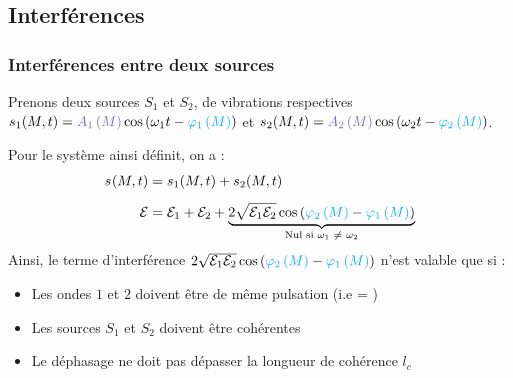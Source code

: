 \documentclass[11pt,a4paper,fleqn,pdftex]{report}
\begin{document}
\subsection{Interférences}
\subsubsection{Interférences entre deux sources}
Prenons deux sources $S_1$ et $S_2$, de vibrations respectives $\vibration[1] = \amplitude[1]{M}  \cos \left( \pulsation[1] t - \phase[1]{M} \right)$ et $\vibration[2] = \amplitude[2]{M}  \cos \left( \pulsation[2] t - \phase[2]{M} \right)$. \\
\begin{itheorem}
Pour le système ainsi définit, on a :
\begin{align}\label{interferences}
\vibration &= \vibration[1] + \vibration[2] \nonumber \\[5pt]
\Epsilon &= \Epsilon_1 + \Epsilon_2 + \underbrace{2 \sqrt{\Epsilon_1 \Epsilon_2}\cos \left( \phase[2]{M} - \phase[1]{M} \right)}_{\text{Nul si \pulsation[1] $\neq$ \pulsation[2]}}
\end{align}
%
Ainsi, le terme d'interférence $2 \sqrt{\Epsilon_1 \Epsilon_2}\cos \left( \phase[2]{M} - \phase[1]{M} \right)$ n'est valable que si : 
\begin{itemize}[label=$\bullet$]
    \item Les ondes $1$ et $2$ doivent être de même pulsation (i.e \pulsation[1] = \pulsation[2])
    \item Les sources $S_1$ et $S_2$ doivent être cohérentes
    \item Le déphasage ne doit pas dépasser la longueur de cohérence $l_c$
\end{itemize}
\end{itheorem}
\end{document}
